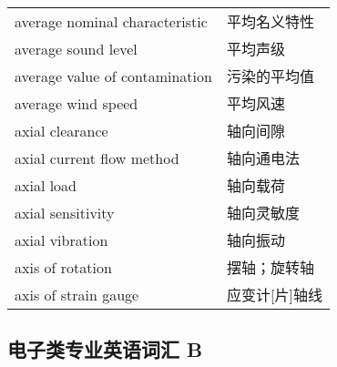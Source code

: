 \documentclass[
]{article}
\begin{document}
\begin{longtable}[]{@{}ll@{}}
average nominal characteristic & 平均名义特性 \\
average sound level & 平均声级 \\
average value of contamination & 污染的平均值 \\
average wind speed & 平均风速 \\
axial clearance & 轴向间隙 \\
axial current flow method & 轴向通电法 \\
axial load & 轴向载荷 \\
axial sensitivity & 轴向灵敏度 \\
axial vibration & 轴向振动 \\
axis of rotation & 摆轴；旋转轴 \\
axis of strain gauge & 应变计{[}片{]}轴线 \\
\bottomrule()
\end{longtable}

\hypertarget{ux7535ux5b50ux7c7bux4e13ux4e1aux82f1ux8bedux8bcdux6c47-b}{%
\subsection{\texorpdfstring{电子类专业英语词汇 B
}{电子类专业英语词汇 B }}\label{ux7535ux5b50ux7c7bux4e13ux4e1aux82f1ux8bedux8bcdux6c47-b}}
\end{document}
